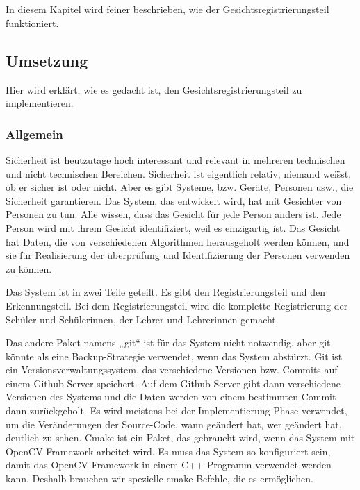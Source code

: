\chapter{\docname}
In diesem Kapitel wird feiner beschrieben, wie der Gesichtsregistrierungsteil funktioniert.
\label{\docname}
\section{Umsetzung}
Hier wird erkl\"art, wie es gedacht ist, den Gesichtsregistrierungsteil zu implementieren. 
\subsection{Allgemein}
Sicherheit ist heutzutage hoch interessant und relevant in mehreren technischen und nicht technischen Bereichen. Sicherheit ist eigentlich relativ, niemand wei\"sst, ob er sicher ist oder nicht. Aber es gibt Systeme, bzw. Ger\"ate, Personen usw., die Sicherheit garantieren. Das System, das entwickelt wird, hat mit Gesichter von Personen zu tun. Alle wissen, dass das Gesicht f\"ur jede Person anders ist. Jede Person wird mit ihrem Gesicht identifiziert, weil es einzigartig ist. Das Gesicht hat Daten, die von verschiedenen Algorithmen herausgeholt werden k\"onnen, und sie f\"ur Realisierung der \"uberpr\"ufung und Identifizierung der Personen verwenden zu k\"onnen. 

Das System ist in zwei Teile geteilt. Es gibt den Registrierungsteil und den Erkennungsteil. Bei dem Registrierungsteil wird die komplette Registrierung der Sch\"uler und Sch\"ulerinnen, der Lehrer und Lehrerinnen gemacht. 

Das andere Paket namens „git“ ist f\"ur das System nicht notwendig, aber git k\"onnte als eine Backup-Strategie verwendet, wenn das System abst\"urzt. Git ist ein Versionsverwaltungssystem, das verschiedene Versionen bzw. Commits auf einem Github-Server speichert. Auf dem Github-Server gibt dann verschiedene Versionen des Systems und die Daten werden von einem bestimmten Commit dann zur\"uckgeholt. Es wird meistens bei der Implementierung-Phase verwendet, um die Ver\"anderungen der Source-Code, wann ge\"andert hat, wer ge\"andert hat, deutlich zu sehen.
Cmake ist ein Paket, das gebraucht wird, wenn das System mit OpenCV-Framework arbeitet wird. Es muss das System so konfiguriert sein, damit das OpenCV-Framework in einem C++ Programm verwendet werden kann. Deshalb brauchen wir spezielle cmake Befehle, die es erm\"oglichen.

